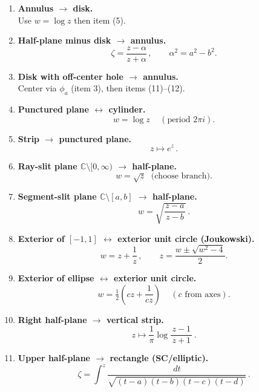 \documentclass[11pt]{article}
\begin{document}
\begin{enumerate}
	\item \textbf{Annulus $\to$ disk.}\\[2pt]
	Use $w=\log z$ then item (5).
	
	\item \textbf{Half-plane minus disk $\to$ annulus.}\\[2pt]
	\[
	\boxed{\,\zeta=\frac{z-\alpha}{z+\alpha}\,},\qquad \alpha^{2}=a^{2}-b^{2}.
	\]
	
	\item \textbf{Disk with off-center hole $\to$ annulus.}\\[2pt]
	Center via $\phi_a$ (item 3), then items (11)–(12).
	
	\item \textbf{Punctured plane $\leftrightarrow$ cylinder.}\\[2pt]
	\[
	\boxed{\,w=\log z\,}\quad(\text{period }2\pi i).
	\]
	
	\item \textbf{Strip $\to$ punctured plane.}\\[2pt]
	\[
	\boxed{\,z\mapsto e^{z}\,}.
	\]
	
	\item \textbf{Ray-slit plane $\mathbb C\setminus[0,\infty)$ $\to$ half-plane.}\\[2pt]
	\[
	\boxed{\,w=\sqrt{z}\,}\ \ \text{(choose branch)}.
	\]
	
	\item \textbf{Segment-slit plane $\mathbb C\setminus[a,b]$ $\to$ half-plane.}\\[2pt]
	\[
	\boxed{\,w=\sqrt{\frac{z-a}{\,z-b\,}}\,}.
	\]
	
	\item \textbf{Exterior of $[-1,1]$ $\leftrightarrow$ exterior unit circle (Joukowski).}\\[2pt]
	\[
	\boxed{\,w=z+\frac{1}{z}\,},\qquad
	z=\frac{w\pm\sqrt{w^{2}-4}}{2}.
	\]
	
	\item \textbf{Exterior of ellipse $\leftrightarrow$ exterior unit circle.}\\[2pt]
	\[
	\boxed{\,w=\tfrac12\!\left(c z+\frac{1}{c z}\right)\,}\quad(\text{$c$ from axes}).
	\]
	
	\item \textbf{Right half-plane $\to$ vertical strip.}\\[2pt]
	\[
	\boxed{\,z\mapsto \frac{1}{\pi}\log\frac{z-1}{\,z+1\,}\,}.
	\]
	
	\item \textbf{Upper half-plane $\to$ rectangle (SC/elliptic).}\\[2pt]
	\[
	\boxed{\,\zeta=\int^z \frac{dt}{\sqrt{(t-a)(t-b)(t-c)(t-d)}}\,}.
	\]
	

\end{enumerate}
\end{document}
